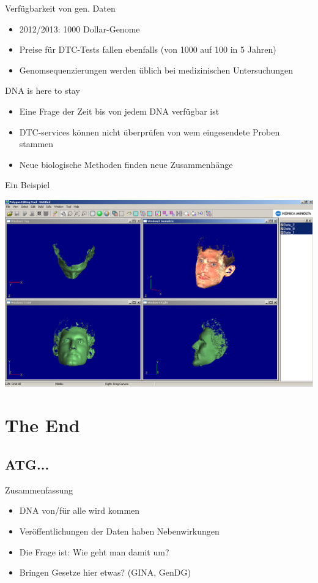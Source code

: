 \documentclass[12pt,a4paper]{beamer}
\begin{document}
\begin{frame}{Verfügbarkeit von gen. Daten}
	\begin{itemize}
		\item 2012/2013: 1000 Dollar-Genome 
		\pause \item Preise für DTC-Tests fallen ebenfalls (von 1000 auf 100 in 5 Jahren)
		\pause \item Genomsequenzierungen werden üblich bei medizinischen Untersuchungen
	\end{itemize}	
\end{frame}

\begin{frame}{DNA is here to stay}
	\begin{itemize}
		\item Eine Frage der Zeit bis von jedem DNA verfügbar ist
		\pause \item DTC-services können nicht überprüfen von wem eingesendete Proben stammen
		\pause \item Neue biologische Methoden finden neue Zusammenhänge 
	\end{itemize}
\end{frame}

\begin{frame}{Ein Beispiel}
	\begin{center}
		\includegraphics[scale=0.30]{head.png}
	\end{center}
	
\end{frame}

\section{The End}
\subsection{ATG...}
	\begin{frame}{Zusammenfassung}
		\begin{itemize}
			\item DNA von/für alle wird kommen
			\item Veröffentlichungen der Daten haben Nebenwirkungen
			\item Die Frage ist: Wie geht man damit um? 
			\item Bringen Gesetze hier etwas? (GINA, GenDG)
		\end{itemize}
	\end{frame}
\end{document}
